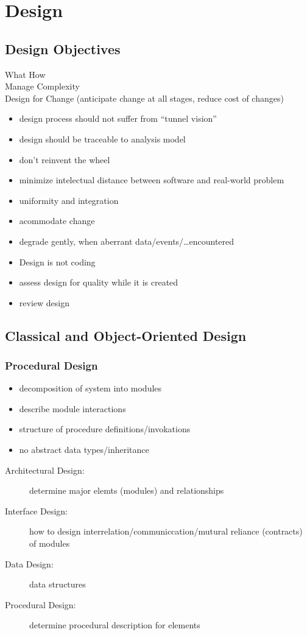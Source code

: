 \documentclass[a4paper, 10pt]{article}
\begin{document}
\section{Design}

\subsection{Design Objectives}
What \follows How \\
Manage Complexity \\
Design for Change (anticipate change at all stages, reduce cost of changes)

\begin{itemize}
	\item design process should not suffer from ``tunnel vision''
	\item design should be traceable to analysis model
	\item don't reinvent the wheel
	\item minimize intelectual distance between software and real-world problem
	\item uniformity and integration
	\item acommodate change
	\item degrade gently, when aberrant data/events/\dots encountered
	\item Design is not coding
	\item assess design for quality while it is created
	\item review design
\end{itemize}

\subsection{Classical and Object-Oriented Design}
\subsubsection{Procedural Design}
\begin{itemize}
	\item decomposition of system into modules
	\item describe module interactions
	\item structure of procedure definitions/invokations
	\item no abstract data types/inheritance
\end{itemize}
\begin{description}
	\item[Architectural Design:] determine major elemts (modules) and relationships
	\item[Interface Design:] how to design interrelation/communiccation/mutural reliance (contracts) of modules
	\item[Data Design:] data structures
	\item[Procedural Design:] determine procedural description for elements
\end{description}
\end{document}
